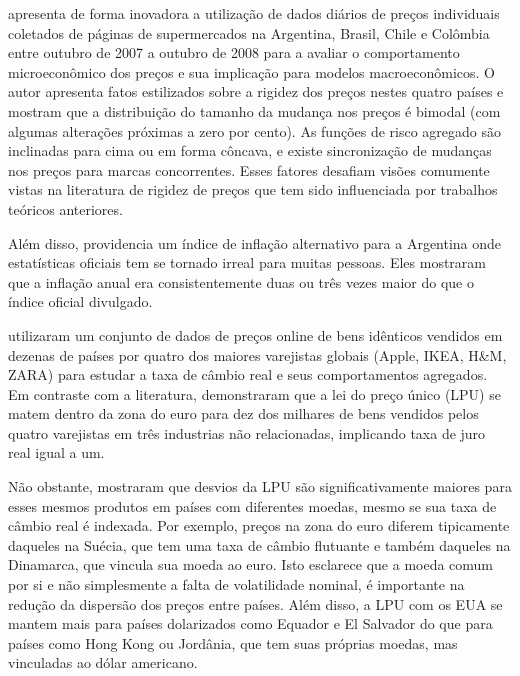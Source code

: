 \documentclass[twoside,a4paper,11pt]{report}
\begin{document}
\citet{cavallo2010scraped} apresenta de forma inovadora a utilização de dados diários de preços individuais coletados de páginas de supermercados na Argentina, Brasil, Chile e Colômbia entre outubro de 2007 a outubro de 2008 para a avaliar o comportamento microeconômico dos preços e sua implicação para modelos macroeconômicos. O autor apresenta fatos estilizados sobre a rigidez dos preços nestes quatro países e mostram que a distribuição do tamanho da mudança nos preços é bimodal (com algumas alterações próximas a zero por cento). As funções de risco agregado são inclinadas para cima ou em forma côncava, e existe sincronização de mudanças nos preços para marcas concorrentes. Esses fatores desafiam visões comumente vistas na literatura de rigidez de preços que tem sido influenciada por trabalhos teóricos anteriores. 
  
Além disso, \citet{cavallo2010scraped} providencia um índice de inflação alternativo para a Argentina onde estatísticas oficiais tem se tornado irreal para muitas pessoas. Eles mostraram que a inflação anual era consistentemente duas ou três vezes maior do que o índice oficial divulgado. 

 \citet{cavallo2012currency} utilizaram um conjunto de dados de preços online de bens idênticos vendidos em dezenas de países por quatro dos maiores varejistas globais (Apple, IKEA, H\&M, ZARA) para estudar a taxa de câmbio real e seus comportamentos agregados. Em contraste com a literatura, demonstraram que a lei do preço único (LPU) se matem dentro da zona do euro para dez dos milhares de bens vendidos pelos quatro varejistas em três industrias não relacionadas, implicando taxa de juro real igual a um.

Não obstante, \citet{cavallo2012currency} mostraram que desvios da LPU são significativamente maiores para esses mesmos produtos em países com diferentes moedas, mesmo se sua taxa de câmbio real é indexada. Por exemplo, preços na zona do euro diferem tipicamente daqueles na Suécia, que tem uma taxa de câmbio flutuante e também daqueles na Dinamarca, que vincula sua moeda ao euro. Isto esclarece que a moeda comum por si e não simplesmente a falta de volatilidade nominal, é importante na redução da dispersão dos preços entre países. Além disso, a LPU com os EUA se mantem mais para países dolarizados como Equador e El Salvador do que para países como Hong Kong ou Jordânia, que tem suas próprias moedas, mas vinculadas ao dólar americano. 
\end{document}
